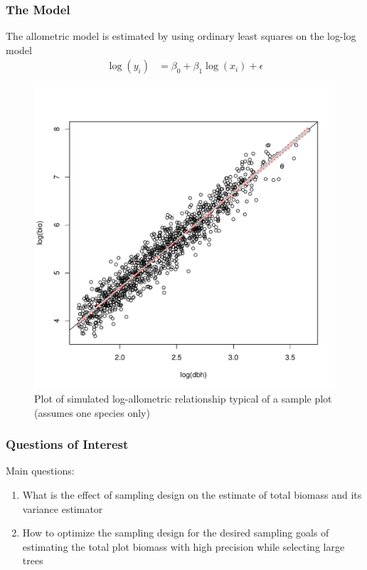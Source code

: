 \documentclass{beamer}
\begin{document}
\begin{frame}
  \frametitle{The Model}
The allometric model is estimated by using ordinary least squares on the log-log model\\
  \begin{align}
  \label{2}
    \log(y_i) & = \beta_0 + \beta_1 \log(x_i) + \epsilon
  \end{align}
  \begin{figure}
    \centering
    \caption{Plot of simulated log-allometric relationship typical of a sample plot (assumes one species only)}
    \includegraphics[scale = 0.15]{dbhLogModel}
  \end{figure}
\end{frame}
%
\begin{frame}
  \frametitle{Questions of Interest}
  Main questions:
  \begin{enumerate}
  \item What is the effect of sampling design on the estimate of total biomass and its variance estimator \vspace{3mm}
  \item How to optimize the sampling design for the desired sampling goals of estimating the total plot biomass with high precision while selecting large trees
  \end{enumerate}
\end{frame}
\end{document}
